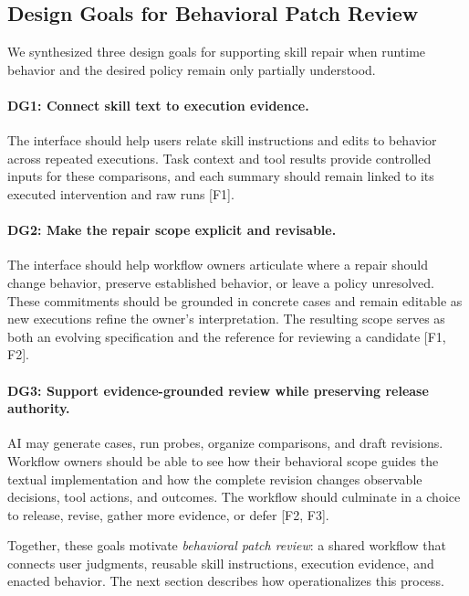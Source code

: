 \subsection{Design Goals for Behavioral Patch Review}
\label{sec:formative-dgs}

We synthesized three design goals for supporting skill repair when runtime
behavior and the desired policy remain only partially understood.

\paragraph{DG1: Connect skill text to execution evidence.}
The interface should help users relate skill instructions and edits to behavior
across repeated executions. Task context and tool results provide controlled
inputs for these comparisons, and each summary should remain linked to its
executed intervention and raw runs [F1].

\paragraph{DG2: Make the repair scope explicit and revisable.}
The interface should help workflow owners articulate where a repair should
change behavior, preserve established behavior, or leave a policy unresolved.
These commitments should be grounded in concrete cases and remain editable as
new executions refine the owner's interpretation. The resulting scope serves
as both an evolving specification and the reference for reviewing a candidate
[F1, F2].

\paragraph{DG3: Support evidence-grounded review while preserving release authority.}
AI may generate cases, run probes, organize comparisons, and draft revisions.
Workflow owners should be able to see how their behavioral scope guides the
textual implementation and how the complete revision changes observable
decisions, tool actions, and outcomes. The workflow should culminate in a choice
to release, revise, gather more evidence, or defer [F2, F3].

Together, these goals motivate \emph{behavioral patch review}: a shared workflow
that connects user judgments, reusable skill instructions, execution evidence,
and enacted behavior. The next section describes how \systemname{}
operationalizes this process.
